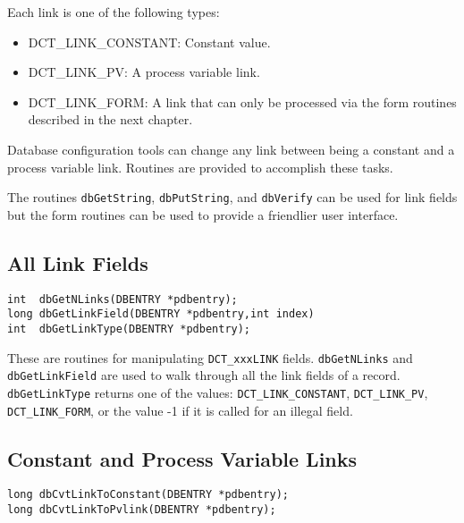 Each link is one of the following types:

\begin{itemize}
\item {}DCT\_LINK\_CONSTANT: Constant value.

\item {}DCT\_LINK\_PV: A process variable link.

\item {}DCT\_LINK\_FORM: A link that can only be processed via the form routines described in the next chapter.

\end{itemize}

Database configuration tools can change any link between being a constant and a process variable link. Routines are 
provided to accomplish these tasks.

The routines \verb|dbGetString|, \verb|dbPutString|, and \verb|dbVerify| can be used for link fields but the form routines can be 
used to provide a friendlier user interface.

\subsection{All Link Fields}

\begin{verbatim}
int  dbGetNLinks(DBENTRY *pdbentry);
long dbGetLinkField(DBENTRY *pdbentry,int index)
int  dbGetLinkType(DBENTRY *pdbentry);
\end{verbatim}

These are routines for manipulating \verb|DCT_xxxLINK| fields. \verb|dbGetNLinks| and \verb|dbGetLinkField| are used to walk 
through all the link fields of a record. \verb|dbGetLinkType| returns one of the values: \verb|DCT_LINK_CONSTANT|, 
\verb|DCT_LINK_PV|, \verb|DCT_LINK_FORM|, or the value -1 if it is called for an illegal field.

\subsection{Constant and Process Variable Links}

\begin{verbatim}
long dbCvtLinkToConstant(DBENTRY *pdbentry);
long dbCvtLinkToPvlink(DBENTRY *pdbentry);
\end{verbatim}

